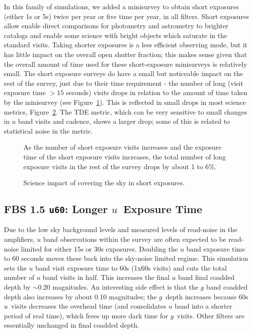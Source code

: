 In this family of simulations, we added a minisurvey to obtain short exposures (either 1s or 5s) twice per year or five time per year, in all filters. Short exposures allow enable direct comparisons for photometry and astrometry to brighter catalogs and enable some science with bright objects which saturate in the standard visits. Taking shorter exposures is a less efficient observing mode, but it has little impact on the overall open shutter fraction; this makes sense given that the overall amount of time used for these short-exposure minisurveys is relatively small. The short exposure surveys do have a small but noticeable impact on the rest of the survey, just due to their time requirement - the number of long (visit exposure time $>15$ seconds) visits drops in relation to the amount of time taken by the minisurvey (see Figure~\ref{fig:shortexp_nvisits}). This is reflected in small drops in most science metrics, Figure~\ref{fig:shortexp_radar}. The TDE metric, which can be very sensitive to small changes in $u$ band visits and cadence, shows a larger drop; some of this is related to statistical noise in the metric. 

\begin{figure}
\caption{As the number of short exposure visits increases and the exposure time of the short exposure visits increases, the total number of long exposure visits in the rest of the survey drops by about 1 to 6\%. }\label{fig:shortexp_nvisits}
\end{figure}

\begin{figure}
\caption{Science impact of covering the sky in short exposures. }\label{fig:shortexp_radar}
\end{figure}


\subsection{FBS 1.5 {\tt u60}: Longer $u$\ Exposure Time}\label{ss:u60}

Due to the low sky background levels and measured levels of read-noise in the amplifiers, $u$ band observations within the survey are often expected to be read-noise limited for either 15s or 30s exposures. Doubling the $u$ band exposure time to 60 seconds moves these back into the sky-noise limited regime. This simulation sets the $u$ band visit exposure time to 60s (1x60s visits) and cuts the total number of $u$ band visits in half. This increases the final $u$ band final coadded depth by $\sim$0.20 magnitudes. An interesting side effect is that the $g$ band coadded depth also increases by about 0.10 magnitudes; the $g$\ depth increases because 60s $u$\ visits decreases the overhead time (and consolidates $u$ band into a shorter period of real time), which frees up more dark time for $g$\ visits. Other filters are essentially unchanged in final coadded depth. 

